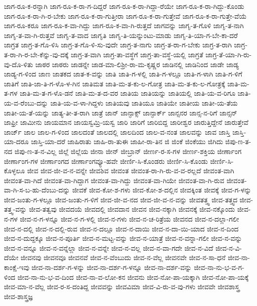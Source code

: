 {ಜಾಗ-ರೂ-ಕ-ರನ್ನಾಗಿ
ಜಾಗ-ರೂ-ಕ-ರಾ-ಗ-ದಿದ್ದರೆ
ಜಾಗ-ರೂ-ಕ-ರಾ-ಗಿದ್ದಾ-ರೆಯೇ
ಜಾಗ-ರೂ-ಕ-ರಾ-ಗಿದ್ದು-ಕೊಂಡು
ಜಾಗ-ರೂ-ಕ-ರಾ-ಗಿ-ರ-ಬೇಕು
ಜಾಗ-ರೂ-ಕ-ರಾ-ಗುತ್ತೀರಾ
ಜಾಗ-ರೂ-ಕ-ರಾ-ಗುತ್ತೇವೆ
ಜಾಗ-ರೂ-ಕ-ರಾ-ಗುತ್ತೇ-ವೆಯೆ
ಜಾಗ-ರೂ-ಕರೂ
ಜಾಗ-ರೂ-ಕ-ವಾ-ಗಿದ್ದು
ಜಾಗ-ರೂ-ಕ-ವಾ-ಗಿ-ರುತ್ತದೆ
ಜಾಗವನ್ನು
ಜಾಗೃ-ತ-ಗೊಳಿ
ಜಾಗೃ-ತ-ನಾಗಿ
ಜಾಗೃ-ತ-ವಾ-ಗಿ-ರುತ್ತವೆ
ಜಾಗೃ-ತ-ವಾದ
ಜಾಗೃತಿ
ಜಾಗೃ-ತಿ-ಯನ್ನುಂಟು-ಮಾಡು
ಜಾಗೃ-ತಿ-ಯಾ-ಗ-ಬೇ-ಕಾ-ದರೆ
ಜಾಗ್ರತ
ಜಾಗ್ರ-ತ-ಗೊ-ಳಿಸಿ
ಜಾಗ್ರ-ತ-ಗೊ-ಳಿ-ಸು-ವುದೇ
ಜಾಗ್ರ-ತ-ನಾಗು
ಜಾಗ್ರ-ತ-ರಾ-ಗ-ಬೇಕು
ಜಾಗ್ರ-ತ-ರಾಗಿ
ಜಾಗ್ರ-ತ-ರಾ-ಗಿ-ರ-ಬೇ-ಕೆನ್ನು-ವು-ದಕ್ಕೆ
ಜಾಗ್ರ-ತ-ವಾಗಿ
ಜಾಗ್ರ-ತಾ-ವಸ್ಥೆಗೆ
ಜಾಗ್ರ-ತಾ-ವಸ್ಥೆ-ಯಲ್ಲಿ
ಜಾಗ್ರತೆ
ಜಾಗ್ರ-ತೆ-ಯಾ-ಗಿ-ರು-ವು-ದೊ-ಳಿತು
ಜಾಠರ
ಜಾಠರು
ಜಾಡನ್ನೇ
ಜಾಡ-ಮಾ-ಲಿಶ್ರೀ-ರಾ-ಮ-ಕೃಷ್ಣರ
ಜಾಡಿನಲ್ಲಿ
ಜಾಡಿನಿಂದ
ಜಾಡೇ
ಜಾಡ್ಯ
ಜಾಡ್ಯ-ಗ-ಳಿಂದ
ಜಾಣ
ಜಾತಕದ
ಜಾತ-ಕ-ವನ್ನು
ಜಾತಿ
ಜಾತಿ-ಗ-ಳಲ್ಲಿ
ಜಾತಿ-ಗ-ಳಲ್ಲೂ
ಜಾತಿ-ಗ-ಳಾಗಿ
ಜಾತಿ-ಗ-ಳಿಗೆ
ಜಾತಿಗೆ
ಜಾತಿ-ಜಾ-ತಿ-ಗ-ಳೊ-ಳ-ಗಿನ
ಜಾತಿಮತ
ಜಾತಿ-ಮ-ತ-ಕು-ಲ-ಗೋತ್ರ
ಜಾತಿ-ಮ-ತ-ಕು-ಲ-ಗೋತ್ರಕ್ಕೆ
ಜಾತಿ-ಮ-ತ-ಗಳ
ಜಾತಿ-ಮ-ತ-ಗ-ಳೊ-ಡನೆ
ಜಾತಿ-ಮ-ತ-ದ-ವರ
ಜಾತಿಯ
ಜಾತಿಯನ್ನು
ಜಾತಿಯಲ್ಲಿ
ಜಾತಿ-ಯ-ವ-ರಿಗೂ
ಜಾತಿ-ಯ-ವ-ರೆಂಬು-ದನ್ನು
ಜಾತಿ-ಯ-ವ-ಳಾ-ಗಿದ್ದಳು
ಜಾತಿಯವು
ಜಾತಿಯೂ
ಜಾತಿಯೇ
ಜಾತೀಯ
ಜಾತೀ-ಯ-ತೆಯ
ಜಾತೀ-ಯ-ತೆ-ಯನ್ನು
ಜಾತ್ಯ-ತೀ-ತ-ರಾಗಿ
ಜಾತ್ರೆ
ಜಾನ್
ಜಾನ್ಫಾಕ್ಸ್
ಜಾನ್ಫಾರ್ಕ್
ಜಾನ್ಸನರ
ಜಾನ್ಸ-ನ-ರಿಗೆ
ಜಾನ್ಸನ್
ಜಾಫ್ರೀ
ಜಾಮೀನು
ಜಾಯಮಾನ
ಜಾಯಸ್ವಮ್ರಿ-ಯಸ್ವ
ಜಾರಿ
ಜಾರಿಗೆ
ಜಾರಿಬಿದ್ದ
ಜಾರೀಶ್ವರ
ಜಾರುತ್ತಿದ್ದೇನೆ
ಜಾರುತ್ತೇವೆ
ಜಾರ್ಜ್
ಜಾಲ
ಜಾಲ-ಗ-ಳಿಂದ
ಜಾಲದಂತೆ
ಜಾಲದಲ್ಲಿ
ಜಾಲದಿಂದ
ಜಾಲ-ವ-ನಂತ
ಜಾಲವನ್ನು
ಜಾವ
ಜಾಸ್ತಿ
ಜಾಸ್ತಿ-ಯಾ-ದರೂ
ಜಾಸ್ತಿ-ಯಾ-ದರೆ
ಜಾಹಿರಾತು
ಜಾಹಿ-ರಾ-ತುಈ
ಜಾಹೀ-ರಾ-ತಿನ
ಜಿ
ಜಿಂಕೆ
ಜಿಂಕೆಯು
ಜಿಗಿದು
ಜಿಪು-ಣ-ತ-ನದ
ಜಿಪು-ಣ-ತ-ನ-ವಿಲ್ಲ
ಜಿಲ್ಲೆ
ಜಿಲ್ಲೆಯ
ಜೀನಾ
ಜೀನ್
ಜೀಬ್ರಾನ್
ಜೀರ್ಣ-ರ-ಸ-ಗಳ
ಜೀರ್ಣ-ಶಕ್ತಿಯ
ಜೀರ್ಣಾಂಗ
ಜೀರ್ಣಾಂಗ-ಗಳ
ಜೀರ್ಣಾಂಗದ
ಜೀರ್ಣಾಂಗವ್ಯೂ-ಹವೇ
ಜೀರ್ಣಿ-ಸಿ-ಕೊಂಡರು
ಜೀರ್ಣಿ-ಸಿ-ಕೊಂಡು
ಜೀರ್ಣಿ-ಸಿ-ಕೊಳ್ಳಲೂ
ಜೀವ
ಜೀವ-ಜೀ-ವ-ನ-ವನ್ನೇ
ಜೀವಶಿವ
ಜೀವಂತ
ಜೀವಂತ-ರಾ-ಗಿ-ರು-ವ-ವ-ರಲ್ಲದೆ
ಜೀವಂತ-ವಾಗಿ
ಜೀವಂತ-ವಾ-ಗಿದೆ
ಜೀವಂತ-ವಾ-ಗಿದ್ದಾಗ
ಜೀವಂತ-ವಾ-ಗಿದ್ದು
ಜೀವಂತ-ವಾ-ಗಿಯೇ
ಜೀವಂತ-ವಾ-ಗಿ-ರುವ
ಜೀವಂತ-ವಾ-ಗಿ-ಸ-ಬ-ಹು-ದೆಂಬು-ದನ್ನು
ಜೀವಕೆ
ಜೀವ-ಕೋ-ಶ-ಗಳು
ಜೀವ-ಕೋ-ಶ-ದಲ್ಲಿನ
ಜೀವಕ್ಕಿಂತ
ಜೀವಕ್ಕೆ
ಜೀವ-ಗ-ಳನ್ನು
ಜೀವ-ಜಂತು-ಗ-ಳಲ್ಲೂ
ಜೀವ-ಜಂತು-ಗ-ಳಿಗೆ
ಜೀವ-ಜೀ-ವ-ನದ
ಜೀವ-ಜೀ-ವ-ನ-ವನ್ನು
ಜೀವತತ್ತ್ವ
ಜೀವ-ತತ್ತ್ವದ
ಜೀವ-ತತ್ತ್ವ-ವನ್ನು
ಜೀವ-ತತ್ವವು
ಜೀವದಯೆ
ಜೀವದಲ್ಲಿ
ಜೀವದಾನ
ಜೀವನ
ಜೀವ-ನಕ್ಕಾಗಿ
ಜೀವನಕ್ಕೆ
ಜೀವ-ನಕ್ಕೊಂದು
ಜೀವ-ನ-ಗಳ
ಜೀವ-ನ-ಗ-ಳನ್ನೂ
ಜೀವ-ನ-ಗ-ಳಲ್ಲಿ
ಜೀವ-ನ-ಗಳು
ಜೀವ-ನ-ಚ-ರಿತ್ರೆಯ
ಜೀವನದ
ಜೀವ-ನ-ದಲ್ಲಾ-ಗಲೀ
ಜೀವ-ನ-ದಲ್ಲಿ
ಜೀವ-ನ-ದಲ್ಲಿ-ರುವ
ಜೀವ-ನ-ದಲ್ಲೂ
ಜೀವ-ನ-ದಾಯಿ
ಜೀವ-ನ-ದಾ-ಯಿ-ಯಾದ
ಜೀವ-ನ-ದಿಂದ
ಜೀವ-ನ-ದುದ್ದಕ್ಕೂ
ಜೀವ-ನ-ಪೂರ್ತಿ
ಜೀವ-ನ-ಮಟ್ಟ-ವನ್ನು
ಜೀವ-ನ-ಯಾತ್ರೆ
ಜೀವ-ನ-ವನ್ನಾ-ಗಲೀ
ಜೀವ-ನ-ವನ್ನು
ಜೀವ-ನ-ವನ್ನೂ
ಜೀವ-ನ-ವನ್ನೆಲ್ಲಾ
ಜೀವ-ನ-ವನ್ನೇ
ಜೀವ-ನ-ವಲ್ಲ
ಜೀವ-ನ-ವಾ-ಗದೇ
ಜೀವ-ನ-ವಿದೆ
ಜೀವ-ನ-ವಿ-ದೆಯೇ
ಜೀವನವು
ಜೀವನವೂ
ಜೀವನವೆ
ಜೀವ-ನ-ವೆಂಬುದು
ಜೀವ-ನ-ವೆಲ್ಲ
ಜೀವನವೇ
ಜೀವ-ನ-ಸಾ-ಧನೆ
ಜೀವ-ನಾ-ಕಾಂಕ್ಷೆ-ಇವು
ಜೀವ-ನಾ-ದರ್ಶ-ಗ-ಳನ್ನು
ಜೀವ-ನಾ-ದರ್ಶ-ಗ-ಳನ್ನೂ
ಜೀವ-ನಾ-ದರ್ಶ-ವನ್ನು
ಜೀವ-ನಾ-ನು-ಭ-ವ-ಗ-ಳಿಂದ
ಜೀವ-ನಾ-ನು-ಭ-ವ-ದಿಂದ
ಜೀವ-ನಾ-ವ-ಲೋ-ಕನ
ಜೀವನು
ಜೀವ-ನೋ-ಪಾ-ಯಕ್ಕಾಗಿ
ಜೀವ-ನೋ-ಪಾ-ಯಕ್ಕೆ
ಜೀವ-ಮಾ-ನ-ವೆಲ್ಲ
ಜೀವ-ರ-ಸ-ದಂತಿದ್ದ
ಜೀವವನ್ನು
ಜೀವವಿಮಾ
ಜೀವ-ವಿ-ರು-ವ-ವು-ಗಳು
ಜೀವವೇ
ಜೀವಶಾಸ್ತ್ರ
ಜೀವ-ಶಾಸ್ತ್ರಜ್ಞ
}

